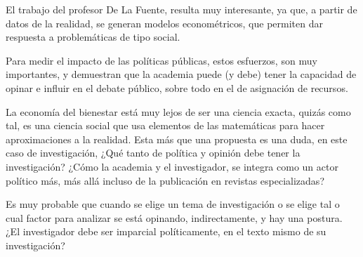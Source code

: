 \documentclass{article}
\begin{document}
El trabajo del profesor De La Fuente, resulta muy interesante, ya que, a partir de datos de la realidad, se generan modelos econométricos, que permiten dar respuesta a problemáticas de tipo social.

Para medir el impacto de las políticas públicas, estos esfuerzos, son muy importantes, y demuestran que la academia puede (y debe) tener la capacidad de opinar e influir en el debate público, sobre todo en el de asignación de recursos.

La economía del bienestar está muy lejos de ser una ciencia exacta, quizás como tal, es una ciencia social que usa elementos de las matemáticas para hacer aproximaciones a la realidad. Esta más que una propuesta es una duda, en este caso de investigación, ¿Qué tanto de política y opinión debe tener la investigación? ¿Cómo la academia y el investigador, se integra como un actor político más, más allá incluso de la publicación en revistas especializadas?

Es muy probable que cuando se elige un tema de investigación o se elige tal o cual factor para analizar se está opinando, indirectamente, y hay una postura. ¿El investigador debe ser imparcial políticamente, en el texto mismo de su investigación?
\nocite{*}
    
    
\end{document}
